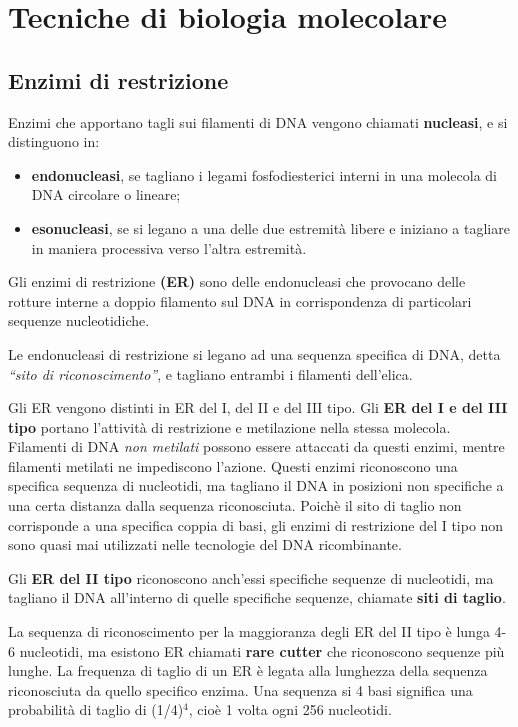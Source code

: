 \documentclass[]{article}
\date{}
\begin{document}
\section{Tecniche di biologia
molecolare}\label{tecniche-di-biologia-molecolare}

\subsection{Enzimi di restrizione}\label{enzimi-di-restrizione}

Enzimi che apportano tagli sui filamenti di DNA vengono chiamati
\textbf{nucleasi}, e si distinguono in:

\begin{itemize}
\itemsep1pt\parskip0pt
\item
  \textbf{endonucleasi}, se tagliano i legami fosfodiesterici interni in
  una molecola di DNA circolare o lineare;
\item
  \textbf{esonucleasi}, se si legano a una delle due estremità libere e
  iniziano a tagliare in maniera processiva verso l'altra estremità.
\end{itemize}

Gli enzimi di restrizione \textbf{(ER)} sono delle endonucleasi che
provocano delle rotture interne a doppio filamento sul DNA in
corrispondenza di particolari sequenze nucleotidiche.

Le endonucleasi di restrizione si legano ad una sequenza specifica di
DNA, detta \emph{``sito di riconoscimento''}, e tagliano entrambi i
filamenti dell'elica.

Gli ER vengono distinti in ER del I, del II e del III tipo. Gli
\textbf{ER del I e del III tipo} portano l'attività di restrizione e
metilazione nella stessa molecola. Filamenti di DNA \emph{non metilati}
possono essere attaccati da questi enzimi, mentre filamenti metilati ne
impediscono l'azione. Questi enzimi riconoscono una specifica sequenza
di nucleotidi, ma tagliano il DNA in posizioni non specifiche a una
certa distanza dalla sequenza riconosciuta. Poichè il sito di taglio non
corrisponde a una specifica coppia di basi, gli enzimi di restrizione
del I tipo non sono quasi mai utilizzati nelle tecnologie del DNA
ricombinante.

Gli \textbf{ER del II tipo} riconoscono anch'essi specifiche sequenze di
nucleotidi, ma tagliano il DNA all'interno di quelle specifiche
sequenze, chiamate \textbf{siti di taglio}.

La sequenza di riconoscimento per la maggioranza degli ER del II tipo è
lunga 4-6 nucleotidi, ma esistono ER chiamati \textbf{rare cutter} che
riconoscono sequenze più lunghe. La frequenza di taglio di un ER è
legata alla lunghezza della sequenza riconosciuta da quello specifico
enzima. Una sequenza si 4 basi significa una probabilità di taglio di
(1/4)\(^4\), cioè 1 volta ogni 256 nucleotidi.
\end{document}
